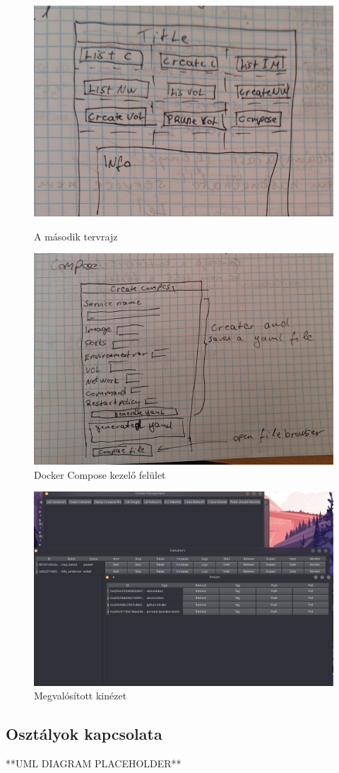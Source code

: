 \begin{figure}[H]
	\centering
	\begin{minipage}{0.45\textwidth}
		\centering
		\includegraphics[width=1\linewidth]{images/2nd_design}
		\caption{A második tervrajz}
		\label{fig:2nd_design}
	\end{minipage}
	\hfill
	\begin{minipage}{0.45\textwidth}
		\centering
		\includegraphics[width=1\linewidth]{images/1st_compose}
		\caption{Docker Compose kezelő felület}
		\label{fig:1st_compose}
	\end{minipage}
\end{figure}


\begin{figure}[H]
	\centering
	\includegraphics[width=0.7\linewidth]{images/0.4}
	\caption{Megvalósított kinézet}
	\label{fig:0.4}
\end{figure}

\subsection{Osztályok kapcsolata}
**UML DIAGRAM PLACEHOLDER**


